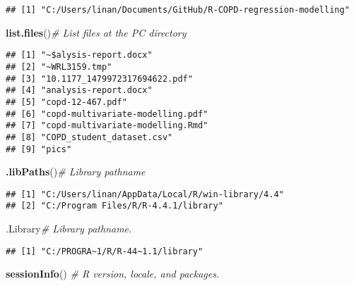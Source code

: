 \documentclass[
]{article}
\newenvironment{Shaded}{\begin{snugshade}}{\end{snugshade}}
\newcommand{\CommentTok}[1]{\textcolor[rgb]{0.56,0.35,0.01}{\textit{#1}}}
\newcommand{\FunctionTok}[1]{\textcolor[rgb]{0.13,0.29,0.53}{\textbf{#1}}}
\newcommand{\NormalTok}[1]{#1}
\begin{document}
\begin{verbatim}
## [1] "C:/Users/linan/Documents/GitHub/R-COPD-regression-modelling"
\end{verbatim}

\begin{Shaded}
\begin{Highlighting}[]
\FunctionTok{list.files}\NormalTok{()}\CommentTok{\# List files at the PC directory}
\end{Highlighting}
\end{Shaded}

\begin{verbatim}
## [1] "~$alysis-report.docx"           
## [2] "~WRL3159.tmp"                   
## [3] "10.1177_1479972317694622.pdf"   
## [4] "analysis-report.docx"           
## [5] "copd-12-467.pdf"                
## [6] "copd-multivariate-modelling.pdf"
## [7] "copd-multivariate-modelling.Rmd"
## [8] "COPD_student_dataset.csv"       
## [9] "pics"
\end{verbatim}

\begin{Shaded}
\begin{Highlighting}[]
\FunctionTok{.libPaths}\NormalTok{()}\CommentTok{\# Library pathname}
\end{Highlighting}
\end{Shaded}

\begin{verbatim}
## [1] "C:/Users/linan/AppData/Local/R/win-library/4.4"
## [2] "C:/Program Files/R/R-4.4.1/library"
\end{verbatim}

\begin{Shaded}
\begin{Highlighting}[]
\NormalTok{.Library}\CommentTok{\# Library pathname.}
\end{Highlighting}
\end{Shaded}

\begin{verbatim}
## [1] "C:/PROGRA~1/R/R-44~1.1/library"
\end{verbatim}

\begin{Shaded}
\begin{Highlighting}[]
\FunctionTok{sessionInfo}\NormalTok{() }\CommentTok{\# R version, locale, and packages.}
\end{Highlighting}
\end{Shaded}
\end{document}
